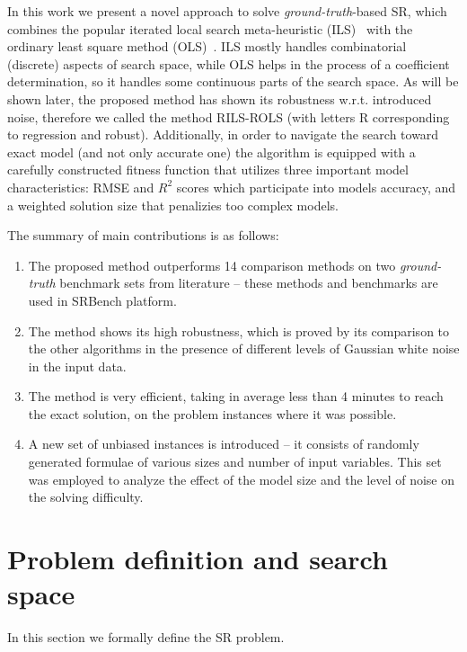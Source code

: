 \documentclass[a4paper,12pt]{elsarticle}
\begin{document}
	In this work we present a novel approach to solve \emph{ground-truth}-based SR, which combines the popular iterated local search meta-heuristic (ILS)~\cite{lourencco2003iterated,lourencco2019iterated} with the ordinary least square method (OLS)~\cite{leng2007ordinary}. ILS mostly handles combinatorial (discrete) aspects of search space, while OLS helps in the process of a coefficient determination, so it handles some continuous parts of the search space. As will be shown later, the proposed method has shown its robustness w.r.t. introduced noise, therefore we called the method \textsc{RILS}-\textsc{ROLS}  (with letters R corresponding to regression and robust). Additionally, in order to navigate the search toward exact model (and not only accurate one) the algorithm is equipped with a carefully constructed fitness function that utilizes three important model characteristics: RMSE and $R^2$ scores which participate into models accuracy, and a weighted solution size that penalizies too complex models. 
	
	The summary of main contributions is as follows: 
	
	\begin{enumerate}
		\item The proposed method outperforms 14 comparison methods on two \emph{ground-truth} benchmark sets from literature -- these methods and benchmarks are used in SRBench platform.  
		
		\item The method shows its high robustness, which is proved by its comparison to the other algorithms in the presence of different levels of Gaussian white noise in the input data. 
		
		\item The method is very efficient, taking in average less than 4 minutes to reach the exact solution, on the problem instances where it was possible. 
		
		\item A new set of unbiased instances is introduced -- it consists of randomly generated formulae of various sizes and number of input variables. This set was employed to analyze the effect of the model size and the level of noise on the solving difficulty. 
	\end{enumerate}
	
	
	\section{Problem definition and search space}
	\label{sec:search-space}
	In this section we formally define the SR problem.
	
\end{document}
